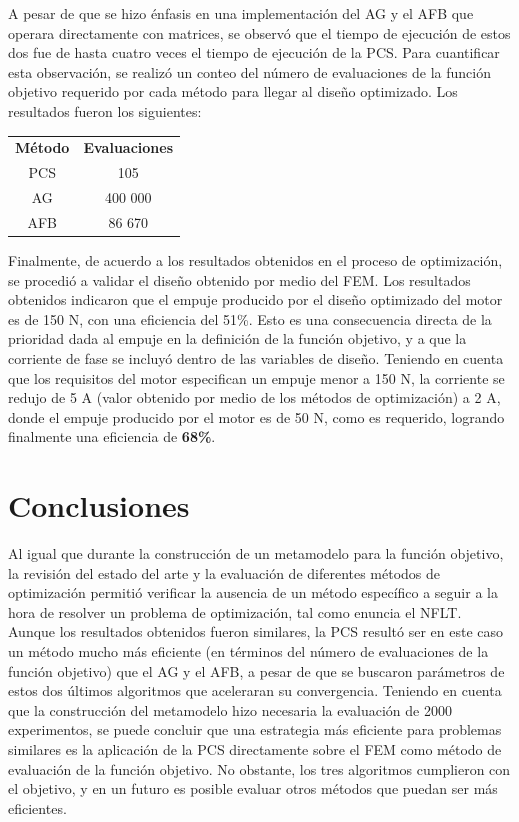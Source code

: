 A pesar de que se hizo énfasis en una implementación del AG y el AFB que operara directamente con matrices, se observó que el tiempo de ejecución de estos dos fue de hasta cuatro veces el tiempo de ejecución de la PCS. Para cuantificar esta observación, se realizó un conteo del número de evaluaciones de la función objetivo requerido por cada método para llegar al diseño optimizado. Los resultados fueron los siguientes:

\begin{table}[h]
\centering
\begin{tabular}{c c}
\textbf{Método} & \textbf{Evaluaciones}\\
PCS & 105\\
AG & 400 000\\
AFB & 86 670
\end{tabular}
\end{table}

Finalmente, de acuerdo a los resultados obtenidos en el proceso de optimización, se procedió a validar el diseño obtenido por medio del FEM. Los resultados obtenidos indicaron que el empuje producido por el diseño optimizado del motor es de 150 N, con una eficiencia del 51\%. Esto es una consecuencia directa de la prioridad dada al empuje en la definición de la función objetivo, y a que la corriente de fase se incluyó dentro de las variables de diseño. Teniendo en cuenta que los requisitos del motor especifican un empuje menor a 150 N, la corriente se redujo de 5 A (valor obtenido por medio de los métodos de optimización) a 2 A, donde el empuje producido por el motor es de 50 N, como es requerido, logrando finalmente una eficiencia de \textbf{68\%}.

\section{Conclusiones}
Al igual que durante la construcción de un metamodelo para la función objetivo, la revisión del estado del arte y la evaluación de diferentes métodos de optimización permitió verificar la ausencia de un método específico a seguir a la hora de resolver un problema de optimización, tal como enuncia el NFLT. Aunque los resultados obtenidos fueron similares, la PCS resultó ser en este caso un método mucho más eficiente (en términos del número de evaluaciones de la función objetivo) que el AG y el AFB, a pesar de que se buscaron parámetros de estos dos últimos algoritmos que aceleraran su convergencia. Teniendo en cuenta que la construcción del metamodelo hizo necesaria la evaluación de 2000 experimentos, se puede concluir que una estrategia más eficiente para problemas similares es la aplicación de la PCS directamente sobre el FEM como método de evaluación de la función objetivo. No obstante, los tres algoritmos cumplieron con el objetivo, y en un futuro es posible evaluar otros métodos que puedan ser más eficientes.

